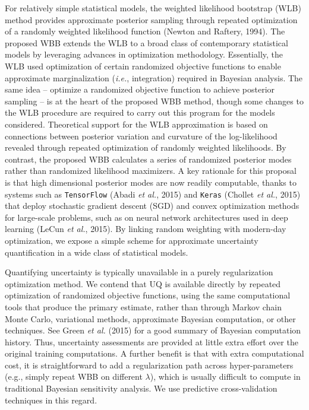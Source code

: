 \documentclass[12pt]{TD-CJS}
\begin{document}
For relatively simple statistical models, the weighted likelihood bootstrap (WLB) method provides
approximate posterior sampling through repeated optimization of a randomly weighted likelihood function (Newton and Raftery, 1994).
The proposed WBB extends the WLB to a broad class of  contemporary statistical models by leveraging advances in optimization methodology.
Essentially, the WLB used optimization of certain 
randomized objective functions to enable approximate marginalization ({\em i.e.}, integration) 
required in Bayesian analysis.  The same idea -- optimize a randomized objective function to 
achieve  posterior sampling -- is at the heart of the proposed WBB method, though some changes to the WLB procedure are required to 
carry out this program for the models considered.
Theoretical support for the WLB approximation is based on  connections between posterior variation and curvature of 
the log-likelihood revealed through repeated optimization of randomly weighted likelihoods. 
 By contrast, the proposed WBB calculates a series of
randomized  posterior modes rather than randomized likelihood maximizers. A key rationale for this proposal is  that 
high dimensional posterior modes are now readily computable, thanks to systems such as \verb+TensorFlow+ (Abadi {\em et al.}, 2015) and 
\verb+Keras+ (Chollet {\em et al.}, 2015)
that deploy stochastic gradient descent (SGD) and convex optimization methods for large-scale
problems, such as on neural network architectures used in deep learning (LeCun {\em et al.}, 2015).
By linking random weighting with modern-day optimization, we expose a simple scheme
for approximate uncertainty quantification in a wide class of statistical models.

Quantifying uncertainty is typically unavailable in a purely regularization optimization method. 
We contend that UQ is available directly by repeated optimization of randomized objective functions, using the same
computational tools that produce the primary estimate,  rather than through Markov
chain Monte Carlo, variational methods,  approximate Bayesian computation, or other techniques. See Green {\em et al.} (2015) for a good summary of Bayesian computation history. Thus, uncertainty assessments are provided at little extra effort over the original
training computations.  A further benefit is that with extra computational cost, it is straightforward to add a regularization path 
across hyper-parameters (e.g., simply repeat WBB on different $\lambda$), which is usually difficult to compute in traditional Bayesian
sensitivity analysis.  We use predictive cross-validation techniques in this regard.
\end{document}
